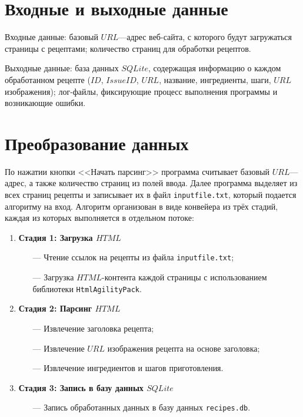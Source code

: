 \chapter{Входные и выходные данные}

Входные данные: базовый $URL$---адрес веб-сайта, с которого будут загружаться страницы с рецептами; количество страниц для обработки рецептов.

Выходные данные: база данных $SQLite$, содержащая информацию о каждом обработанном рецепте ($ID$, $IssueID$, $URL$, название, ингредиенты, шаги, $URL$ изображения); лог-файлы, фиксирующие процесс выполнения программы и возникающие ошибки.

\chapter{Преобразование данных}

По нажатии кнопки <<Начать парсинг>> программа считывает базовый $URL$---адрес, а также количество страниц из полей ввода. Далее программа выделяет из всех страниц рецепты и записывает их в файл \texttt{inputfile.txt}, который подается алгоритму на вход. Алгоритм организован в виде конвейера из трёх стадий, каждая из которых выполняется в отдельном потоке:

\begin{enumerate}
    \item \textbf{Стадия 1: Загрузка $HTML$}
    \begin{itemize}
        \item[---] Чтение ссылок на рецепты из файла \texttt{inputfile.txt};
        \item[---] Загрузка $HTML$-контента каждой страницы с использованием библиотеки \texttt{HtmlAgilityPack}.
    \end{itemize}
    
    \item \textbf{Стадия 2: Парсинг $HTML$}
    \begin{itemize}
        \item[---] Извлечение заголовка рецепта;
        \item[---] Извлечение $URL$ изображения рецепта на основе заголовка;
        \item[---] Извлечение ингредиентов и шагов приготовления.
    \end{itemize}
    
    \item \textbf{Стадия 3: Запись в базу данных $SQLite$}
    \begin{itemize}
        \item[---] Запись обработанных данных в базу данных \texttt{recipes.db}.
    \end{itemize}
\end{enumerate}

